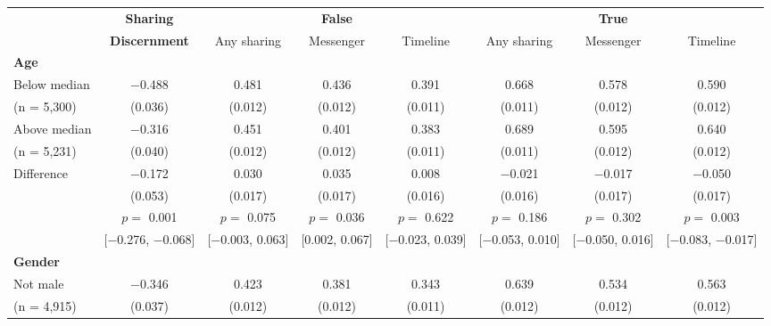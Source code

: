 
\begin{tabular}[t]{lccccccc}
 & \textbf{Sharing} &  & \textbf{False} &  &  & \textbf{True} & \\
 & \textbf{Discernment} & Any sharing & Messenger & Timeline & Any sharing & Messenger & Timeline\\\cmidrule(lr){2-2} \cmidrule(lr){3-5} \cmidrule(lr){6-8} \multicolumn{4}{l}{\textbf{Age}} \rule{0pt}{1.2\normalbaselineskip}\\
\hspace{1em} Below median & \num{-0.488} & \num{0.481} & \num{0.436} & \num{0.391} & \num{0.668} & \num{0.578} & \num{0.590}\\
\hspace{2em}(n = 5,300) & (\num{0.036}) & (\num{0.012}) & (\num{0.012}) & (\num{0.011}) & (\num{0.011}) & (\num{0.012}) & (\num{0.012})\\
\hspace{1em} Above median & \num{-0.316} & \num{0.451} & \num{0.401} & \num{0.383} & \num{0.689} & \num{0.595} & \num{0.640}\\
\hspace{2em}(n = 5,231) & (\num{0.040}) & (\num{0.012}) & (\num{0.012}) & (\num{0.011}) & (\num{0.011}) & (\num{0.012}) & (\num{0.012})\\\cmidrule(lr){2-8}
\hspace{1em} Difference & \num{-0.172} & \num{0.030} & \num{0.035} & \num{0.008} & \num{-0.021} & \num{-0.017} & \num{-0.050}\\
\hspace{2em} & (\num{0.053}) & (\num{0.017}) & (\num{0.017}) & (\num{0.016}) & (\num{0.016}) & (\num{0.017}) & (\num{0.017})\\
 & $p =$ \num{0.001} & $p =$ \num{0.075} & $p =$ \num{0.036} & $p =$ \num{0.622} & $p =$ \num{0.186} & $p =$ \num{0.302} & $p =$ \num{0.003}\\
 & {}[\num{-0.276}, \num{-0.068}] & {}[\num{-0.003}, \num{0.063}] & {}[\num{0.002}, \num{0.067}] & {}[\num{-0.023}, \num{0.039}] & {}[\num{-0.053}, \num{0.010}] & {}[\num{-0.050}, \num{0.016}] & {}[\num{-0.083}, \num{-0.017}]\\\multicolumn{4}{l}{\textbf{Gender}} \rule{0pt}{1.2\normalbaselineskip}\\
\hspace{1em} Not male & \num{-0.346} & \num{0.423} & \num{0.381} & \num{0.343} & \num{0.639} & \num{0.534} & \num{0.563}\\
\hspace{2em}(n = 4,915) & (\num{0.037}) & (\num{0.012}) & (\num{0.012}) & (\num{0.011}) & (\num{0.012}) & (\num{0.012}) & (\num{0.012})\\

\end{tabular}
